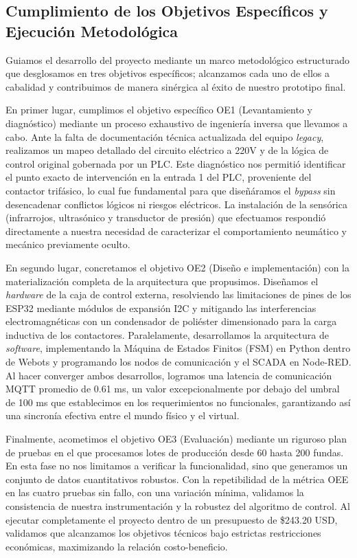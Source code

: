 \subsection{Cumplimiento de los Objetivos Específicos y Ejecución Metodológica}

Guiamos el desarrollo del proyecto mediante un marco metodológico estructurado que desglosamos en tres objetivos específicos; alcanzamos cada uno de ellos a cabalidad y contribuimos de manera sinérgica al éxito de nuestro prototipo final.

En primer lugar, cumplimos el objetivo específico OE1 (Levantamiento y diagnóstico) mediante un proceso exhaustivo de ingeniería inversa que llevamos a cabo. Ante la falta de documentación técnica actualizada del equipo \textit{legacy}, realizamos un mapeo detallado del circuito eléctrico a 220V y de la lógica de control original gobernada por un PLC. Este diagnóstico nos permitió identificar el punto exacto de intervención en la entrada 1 del PLC, proveniente del contactor trifásico, lo cual fue fundamental para que diseñáramos el \textit{bypass} sin desencadenar conflictos lógicos ni riesgos eléctricos. La instalación de la sensórica (infrarrojos, ultrasónico y transductor de presión) que efectuamos respondió directamente a nuestra necesidad de caracterizar el comportamiento neumático y mecánico previamente oculto.

En segundo lugar, concretamos el objetivo OE2 (Diseño e implementación) con la materialización completa de la arquitectura que propusimos. Diseñamos el \textit{hardware} de la caja de control externa, resolviendo las limitaciones de pines de los ESP32 mediante módulos de expansión I2C y mitigando las interferencias electromagnéticas con un condensador de poliéster dimensionado para la carga inductiva de los contactores. Paralelamente, desarrollamos la arquitectura de \textit{software}, implementando la Máquina de Estados Finitos (FSM) en Python dentro de Webots y programando los nodos de comunicación y el SCADA en Node-RED. Al hacer converger ambos desarrollos, logramos una latencia de comunicación MQTT promedio de 0.61 ms, un valor excepcionalmente por debajo del umbral de 100 ms que establecimos en los requerimientos no funcionales, garantizando así una sincronía efectiva entre el mundo físico y el virtual.

Finalmente, acometimos el objetivo OE3 (Evaluación) mediante un riguroso plan de pruebas en el que procesamos lotes de producción desde 60 hasta 200 fundas. En esta fase no nos limitamos a verificar la funcionalidad, sino que generamos un conjunto de datos cuantitativos robustos. Con la repetibilidad de la métrica OEE en las cuatro pruebas sin fallo, con una variación mínima, validamos la consistencia de nuestra instrumentación y la robustez del algoritmo de control. Al ejecutar completamente el proyecto dentro de un presupuesto de \$243.20 USD, validamos que alcanzamos los objetivos técnicos bajo estrictas restricciones económicas, maximizando la relación costo-beneficio.

